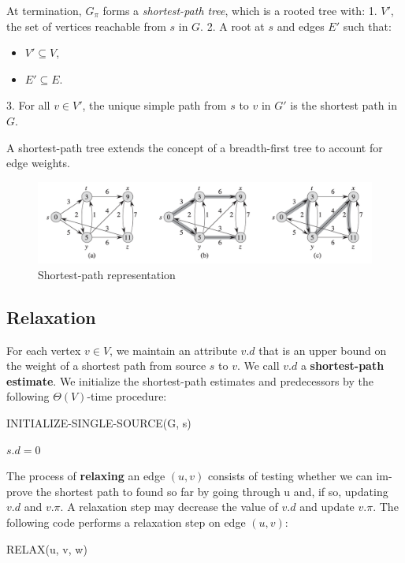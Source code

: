At termination, $G_\pi$ forms a \textit{shortest-path tree}, which is a rooted tree with:
1. $V'$, the set of vertices reachable from $s$ in $G$.
2. A root at $s$ and edges $E'$ such that:
   \begin{itemize}
       \item $V' \subseteq V$,
       \item $E' \subseteq E$.
   \end{itemize}
3. For all $v \in V'$, the unique simple path from $s$ to $v$ in $G'$ is the shortest path in $G$.

A shortest-path tree extends the concept of a breadth-first tree to account for edge weights.

\begin{figure}[H]
    \centering
    \includegraphics[width=\textwidth]{assets/representation_shortest_path.png}
    \caption{Shortest-path representation}
    \label{fig:representation_shortest_path}
\end{figure}

\newpage
\subsection*{Relaxation}

For each vertex $v \in V$, we maintain an attribute $v.d$ that is an upper bound on the weight of a shortest path from source $s$ to $v$. We call $v.d$ a \textbf{shortest-path estimate}. We initialize the shortest-path estimates and predecessors by the following $\Theta(V)$-time procedure:
\begin{algorithm}
    \caption{INITIALIZE-SINGLE-SOURCE(G, s)}
    $s.d = 0$
\end{algorithm}

The process of \textbf{relaxing} an edge $(u, v)$ consists of testing whether we can im-
prove the shortest path to found so far by going through u and, if so, updating $v.d$ and $v.\pi$.
A relaxation step may decrease the value of $v.d$ and update $v.\pi$. The following code performs a relaxation step on edge $(u, v)$:
\begin{algorithm}
    \caption{RELAX(u, v, w)}
\end{algorithm}

